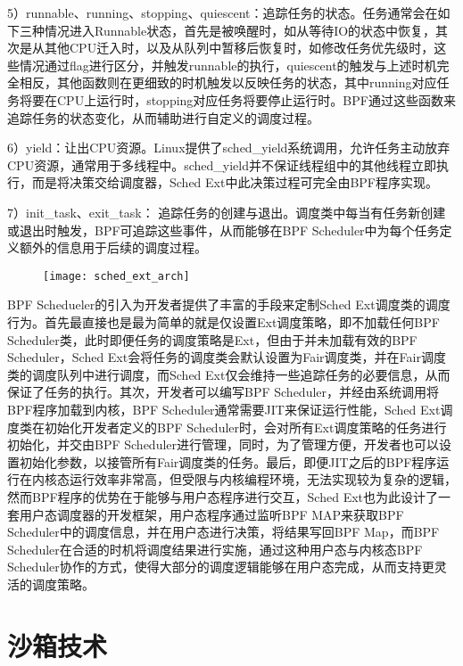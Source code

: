 5）runnable、running、stopping、quiescent：追踪任务的状态。任务通常会在如下三种情况进入Runnable状态，首先是被唤醒时，如从等待IO的状态中恢复，其次是从其他CPU迁入时，以及从队列中暂移后恢复时，如修改任务优先级时，这些情况通过flag进行区分，并触发runnable的执行，quiescent的触发与上述时机完全相反，其他函数则在更细致的时机触发以反映任务的状态，其中running对应任务将要在CPU上运行时，stopping对应任务将要停止运行时。BPF通过这些函数来追踪任务的状态变化，从而辅助进行自定义的调度过程。

6）yield：让出CPU资源。Linux提供了sched\_yield系统调用，允许任务主动放弃CPU资源，通常用于多线程中。sched\_yield并不保证线程组中的其他线程立即执行，而是将决策交给调度器，Sched Ext中此决策过程可完全由BPF程序实现。

7）init\_task、exit\_task： 追踪任务的创建与退出。调度类中每当有任务新创建或退出时触发，BPF可追踪这些事件，从而能够在BPF Scheduler中为每个任务定义额外的信息用于后续的调度过程。

\begin{figure}[!htbp]
    \centering
    \texttt{[image: sched\_ext\_arch]}
    \label{fig:sched_ext_arch}
\end{figure}

BPF Schedueler的引入为开发者提供了丰富的手段来定制Sched Ext调度类的调度行为。首先最直接也是最为简单的就是仅设置Ext调度策略，即不加载任何BPF Scheduler类，此时即便任务的调度策略是Ext，但由于并未加载有效的BPF Scheduler，Sched Ext会将任务的调度类会默认设置为Fair调度类，并在Fair调度类的调度队列中进行调度，而Sched Ext仅会维持一些追踪任务的必要信息，从而保证了任务的执行。其次，开发者可以编写BPF Scheduler，并经由系统调用将BPF程序加载到内核，BPF Scheduler通常需要JIT来保证运行性能，Sched Ext调度类在初始化开发者定义的BPF Scheduler时，会对所有Ext调度策略的任务进行初始化，并交由BPF Scheduler进行管理，同时，为了管理方便，开发者也可以设置初始化参数，以接管所有Fair调度类的任务。最后，即便JIT之后的BPF程序运行在内核态运行效率非常高，但受限与内核编程环境，无法实现较为复杂的逻辑，然而BPF程序的优势在于能够与用户态程序进行交互，Sched Ext也为此设计了一套用户态调度器的开发框架，用户态程序通过监听BPF MAP来获取BPF Scheduler中的调度信息，并在用户态进行决策，将结果写回BPF Map，而BPF Scheduler在合适的时机将调度结果进行实施，通过这种用户态与内核态BPF Scheduler协作的方式，使得大部分的调度逻辑能够在用户态完成，从而支持更灵活的调度策略。

\section{沙箱技术}

